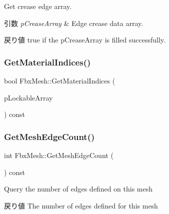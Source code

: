 Get crease edge array. 
\begin{DoxyParams}{引数}
{\em p\+Crease\+Array} & Edge crease data array. \\
\hline
\end{DoxyParams}
\begin{DoxyReturn}{戻り値}
{\ttfamily true} if the p\+Crease\+Array is filled successfully. 
\end{DoxyReturn}
\mbox{\label{class_fbx_mesh_a1929aa2f73049a3c6d07b06b5e8db233}} 
\subsubsection{\texorpdfstring{Get\+Material\+Indices()}{GetMaterialIndices()}}
{\footnotesize\ttfamily bool Fbx\+Mesh\+::\+Get\+Material\+Indices (\begin{DoxyParamCaption}\item[{\hyperlink{class_fbx_layer_element_array_template}{Fbx\+Layer\+Element\+Array\+Template}$<$ int $>$ $\ast$$\ast$}]{p\+Lockable\+Array }\end{DoxyParamCaption}) const}

\mbox{\label{class_fbx_mesh_a74e9f89067b21a959c68d44bea963608}} 
\subsubsection{\texorpdfstring{Get\+Mesh\+Edge\+Count()}{GetMeshEdgeCount()}}
{\footnotesize\ttfamily int Fbx\+Mesh\+::\+Get\+Mesh\+Edge\+Count (\begin{DoxyParamCaption}{ }\end{DoxyParamCaption}) const}

Query the number of edges defined on this mesh \begin{DoxyReturn}{戻り値}
The number of edges defined for this mesh 
\end{DoxyReturn}
\mbox{\label{class_fbx_mesh_aa13c433e2d1733a37a74de640d22a13f}} 
